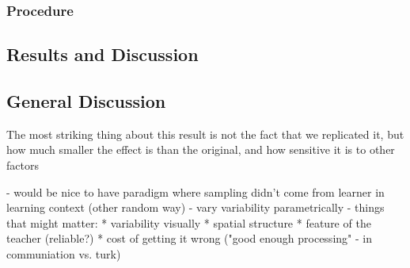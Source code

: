 \documentclass[man]{apa2}
\begin{document}
\subsubsection{Procedure}

\subsection{Results and Discussion}

\subsection{General Discussion}
The most striking thing about this result is not the fact that we replicated it, but how much smaller the effect is than the original, and how sensitive it is to other factors

- would be nice to have paradigm where sampling didn't come from learner in learning context (other random way)
- vary variability parametrically
- things that might matter:
* variability visually
* spatial structure
* feature of the teacher (reliable?)
* cost of getting it wrong ("good enough processing" - in communiation vs. turk)

\nocite{sanchez2003effect}




\newpage
\theappendix 
\end{document}
